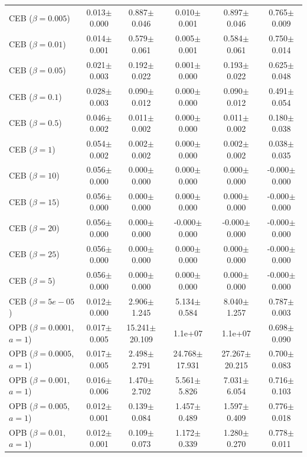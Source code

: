 \begin{table}[t]
{\begin{tabular}{l c c c c c}
CEB ($\beta=0.005$) & 0.013$\pm$0.000 & 0.887$\pm$0.046 & 0.010$\pm$0.001 & 0.897$\pm$0.046 & 0.765$\pm$0.009 \\
CEB ($\beta=0.01$) & 0.014$\pm$0.001 & 0.579$\pm$0.061 & 0.005$\pm$0.001 & 0.584$\pm$0.061 & 0.750$\pm$0.014 \\
CEB ($\beta=0.05$) & 0.021$\pm$0.003 & 0.192$\pm$0.022 & 0.001$\pm$0.000 & 0.193$\pm$0.022 & 0.625$\pm$0.048 \\
CEB ($\beta=0.1$) & 0.028$\pm$0.003 & 0.090$\pm$0.012 & 0.000$\pm$0.000 & 0.090$\pm$0.012 & 0.491$\pm$0.054 \\
CEB ($\beta=0.5$) & 0.046$\pm$0.002 & 0.011$\pm$0.002 & 0.000$\pm$0.000 & 0.011$\pm$0.002 & 0.180$\pm$0.038 \\
CEB ($\beta=1$) & 0.054$\pm$0.002 & 0.002$\pm$0.002 & 0.000$\pm$0.000 & 0.002$\pm$0.002 & 0.038$\pm$0.035 \\
CEB ($\beta=10$) & 0.056$\pm$0.000 & 0.000$\pm$0.000 & 0.000$\pm$0.000 & 0.000$\pm$0.000 & -0.000$\pm$0.000 \\
CEB ($\beta=15$) & 0.056$\pm$0.000 & 0.000$\pm$0.000 & 0.000$\pm$0.000 & 0.000$\pm$0.000 & -0.000$\pm$0.000 \\
CEB ($\beta=20$) & 0.056$\pm$0.000 & 0.000$\pm$0.000 & -0.000$\pm$0.000 & -0.000$\pm$0.000 & -0.000$\pm$0.000 \\
CEB ($\beta=25$) & 0.056$\pm$0.000 & 0.000$\pm$0.000 & 0.000$\pm$0.000 & 0.000$\pm$0.000 & -0.000$\pm$0.000 \\
CEB ($\beta=5$) & 0.056$\pm$0.000 & 0.000$\pm$0.000 & 0.000$\pm$0.000 & 0.000$\pm$0.000 & -0.000$\pm$0.000 \\
CEB ($\beta=5e-05$) & 0.012$\pm$0.000 & 2.906$\pm$1.245 & 5.134$\pm$0.584 & 8.040$\pm$1.257 & 0.787$\pm$0.003 \\
OPB ($\beta=0.0001$, $a=1$) & 0.017$\pm$0.005 & 15.241$\pm$20.109 & 1.1e+07 & 1.1e+07 & 0.698$\pm$0.090 \\
OPB ($\beta=0.0005$, $a=1$) & 0.017$\pm$0.005 & 2.498$\pm$2.791 & 24.768$\pm$17.931 & 27.267$\pm$20.215 & 0.700$\pm$0.083 \\
OPB ($\beta=0.001$, $a=1$) & 0.016$\pm$0.006 & 1.470$\pm$2.702 & 5.561$\pm$5.826 & 7.031$\pm$6.054 & 0.716$\pm$0.103 \\
OPB ($\beta=0.005$, $a=1$) & 0.012$\pm$0.001 & 0.139$\pm$0.084 & 1.457$\pm$0.489 & 1.597$\pm$0.409 & 0.776$\pm$0.018 \\
OPB ($\beta=0.01$, $a=1$) & 0.012$\pm$0.001 & 0.109$\pm$0.073 & 1.172$\pm$0.339 & 1.280$\pm$0.270 & 0.778$\pm$0.011 \\

\end{tabular}}
\end{table}
